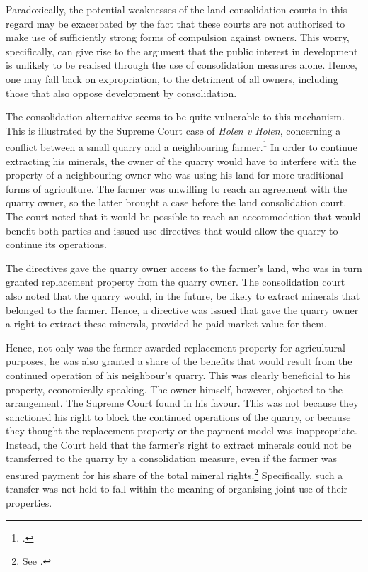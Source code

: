 Paradoxically, the potential weaknesses of the land consolidation courts in this regard may be exacerbated by the fact that these courts are not authorised to make use of sufficiently strong forms of compulsion against owners. This worry, specifically, can give rise to the argument that the public interest in development is unlikely to be realised through the use of consolidation measures alone. Hence, one may fall back on expropriation, to the detriment of all owners, including those that also oppose development by consolidation.

The consolidation alternative seems to be quite vulnerable to this mechanism. This is illustrated by the Supreme Court case of {\it Holen v Holen}, concerning a conflict between a small quarry and a neighbouring farmer.\footcite{holen95} In order to continue extracting his minerals, the owner of the quarry would have to interfere with the property of a neighbouring owner who was using his land for more traditional forms of agriculture. The farmer was unwilling to reach an agreement with the quarry owner, so the latter brought a case before the land consolidation court. The court noted that it would be possible to reach an accommodation that would benefit both parties and issued use directives that would allow the quarry to continue its operations.

The directives gave the quarry owner access to the farmer's land, who was in turn granted replacement property from the quarry owner. The consolidation court also noted that the quarry would, in the future, be likely to extract minerals that belonged to the farmer. Hence, a directive was issued that gave the quarry owner a right to extract these minerals, provided he paid market value for them. 

Hence, not only was the farmer awarded replacement property for agricultural purposes, he was also granted a share of the benefits that would result from the continued operation of his neighbour's quarry. This was clearly beneficial to his property, economically speaking. The owner himself, however, objected to the arrangement. The Supreme Court found in his favour. This was not because they sanctioned his right to block the continued operations of the quarry, or because they thought the replacement property or the payment model was inappropriate. Instead, the Court held that the farmer's  right to extract minerals could not be transferred to the quarry by a consolidation measure, even if the farmer was ensured payment for his share of the total mineral rights.\footnote{See \cite[1481]{holen95}.} Specifically, such a transfer was not held to fall within the meaning of organising joint use of their properties. 

